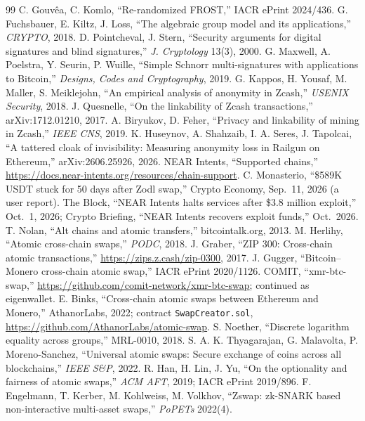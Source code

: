 \documentclass[10pt,letterpaper]{article}
\theoremstyle{plain}
\theoremstyle{definition}
\newcommand{\fn}[1]{\texttt{#1}}
\begin{document}
\begin{thebibliography}{99}
 C. Gouv\^{e}a, C. Komlo, ``Re-randomized FROST,'' IACR ePrint 2024/436.
 G. Fuchsbauer, E. Kiltz, J. Loss, ``The algebraic group model and its applications,'' \emph{CRYPTO}, 2018.
 D. Pointcheval, J. Stern, ``Security arguments for digital signatures and blind signatures,'' \emph{J. Cryptology} 13(3), 2000.
 G. Maxwell, A. Poelstra, Y. Seurin, P. Wuille, ``Simple Schnorr multi-signatures with applications to Bitcoin,'' \emph{Designs, Codes and Cryptography}, 2019.
 G. Kappos, H. Yousaf, M. Maller, S. Meiklejohn, ``An empirical analysis of anonymity in Zcash,'' \emph{USENIX Security}, 2018.
 J. Quesnelle, ``On the linkability of Zcash transactions,'' arXiv:1712.01210, 2017.
 A. Biryukov, D. Feher, ``Privacy and linkability of mining in Zcash,'' \emph{IEEE CNS}, 2019.
 K. Huseynov, A. Shahzaib, I. A. Seres, J. Tapolcai, ``A tattered cloak of invisibility: Measuring anonymity loss in Railgun on Ethereum,'' arXiv:2606.25926, 2026.
 NEAR Intents, ``Supported chains,'' \url{https://docs.near-intents.org/resources/chain-support}.
 C. Monasterio, ``\$589K USDT stuck for 50 days after Zodl swap,'' Crypto Economy, Sep.\ 11, 2026 (a user report).
 The Block, ``NEAR Intents halts services after \$3.8 million exploit,'' Oct.\ 1, 2026; Crypto Briefing, ``NEAR Intents recovers exploit funds,'' Oct.\ 2026.
 T. Nolan, ``Alt chains and atomic transfers,'' bitcointalk.org, 2013.
 M. Herlihy, ``Atomic cross-chain swaps,'' \emph{PODC}, 2018.
 J. Graber, ``ZIP 300: Cross-chain atomic transactions,'' \url{https://zips.z.cash/zip-0300}, 2017.
 J. Gugger, ``Bitcoin--Monero cross-chain atomic swap,'' IACR ePrint 2020/1126.
 COMIT, ``xmr-btc-swap,'' \url{https://github.com/comit-network/xmr-btc-swap}; continued as eigenwallet.
 E. Binks, ``Cross-chain atomic swaps between Ethereum and Monero,'' AthanorLabs, 2022; contract \fn{SwapCreator.sol}, \url{https://github.com/AthanorLabs/atomic-swap}.
 S. Noether, ``Discrete logarithm equality across groups,'' MRL-0010, 2018.
 S. A. K. Thyagarajan, G. Malavolta, P. Moreno-Sanchez, ``Universal atomic swaps: Secure exchange of coins across all blockchains,'' \emph{IEEE S\&P}, 2022.
 R. Han, H. Lin, J. Yu, ``On the optionality and fairness of atomic swaps,'' \emph{ACM AFT}, 2019; IACR ePrint 2019/896.
 F. Engelmann, T. Kerber, M. Kohlweiss, M. Volkhov, ``Zswap: zk-SNARK based non-interactive multi-asset swaps,'' \emph{PoPETs} 2022(4).

\end{thebibliography}
\end{document}
